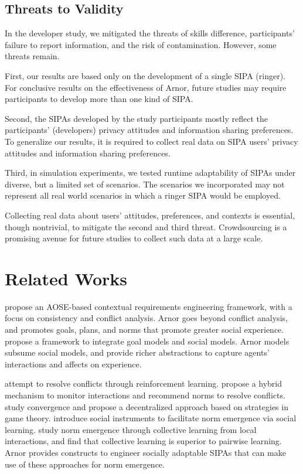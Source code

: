 \documentclass[11pt,          %
               phd,           %
               onehalfspacing %
               ]{ncsuthesis}
\newcommand{\frameworkA}{Arnor\xspace}
\begin{document}
\subsection{Threats to Validity}
\label{sec:threats-to-validity}

In the developer study, we mitigated the threats of skills difference,
participants' failure to report information, and the risk of
contamination. However, some threats remain.

First, our results are based only on the development of a single SIPA
(ringer). For conclusive results on the effectiveness of \frameworkA,
future studies may require participants to develop more than one kind of
SIPA.

Second, the SIPAs developed by the study participants mostly reflect the
participants' (developers) privacy attitudes and information sharing
preferences. To generalize our results, it is required to collect real
data on SIPA users' privacy attitudes and information sharing
preferences.

Third, in simulation experiments, we tested runtime adaptability of
SIPAs under diverse, but a limited set of scenarios. The scenarios we
incorporated may not represent all real world scenarios in which a
ringer SIPA would be employed.

Collecting real data about users' attitudes, preferences, and contexts
is essential, though nontrivial, to mitigate the second and third
threat. Crowdsourcing is a promising avenue for future studies to
collect such data at a large scale.

\section{Related Works}
\label{sec:arnor-related}

\citet{Ali-2013-Reasoning} propose an AOSE-based contextual 
requirements engineering framework, with a focus on consistency and
conflict analysis.  \frameworkA goes beyond conflict analysis, and 
promotes goals, plans, and norms that promote greater social experience. 
\citet{Rahwan-2006-Integrating} propose a framework
to integrate goal models and social models. \frameworkA models subsume
social models, and provide richer abstractions to capture agents'
interactions and affects on experience. 

\citet{Sugawara-IJCAI11-Emergence} attempt to resolve
conflicts through reinforcement learning. \citet{Mashayekhi-IJCAI16-Silk} propose a hybrid mechanism to monitor
interactions and recommend norms to resolve conflicts. 
\citet{Mihaylov-2014-Decentralized} study convergence and propose a
decentralized approach based on strategies in game theory. 
\citet{Villatoro-TAAS13-Robust} introduce social instruments to
facilitate norm emergence via social learning. 
\citet{Yu-AAMAS13-Emergence} study norm emergence through collective
learning from local interactions, and find that collective learning is
superior to pairwise learning. \frameworkA provides constructs to
engineer socially adaptable SIPAs that can make use of these approaches
for norm emergence.
\end{document}
